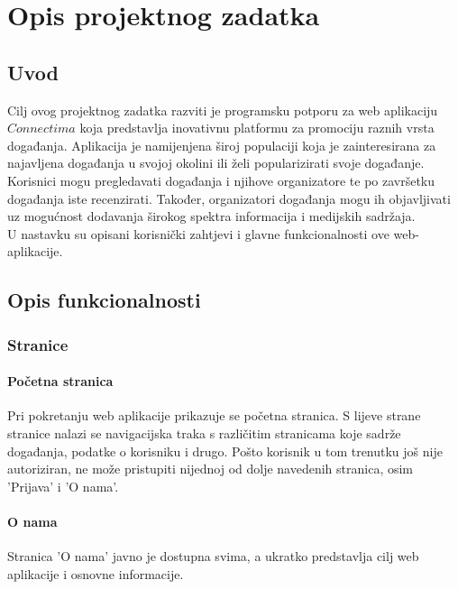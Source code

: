 \chapter{Opis projektnog zadatka}
				
		\section{Uvod}
		
			Cilj ovog projektnog zadatka razviti je programsku potporu za web aplikaciju $\textit{Connectima}$ koja predstavlja inovativnu platformu za promociju raznih vrsta događanja. Aplikacija je namijenjena široj populaciji koja je zainteresirana za najavljena događanja u svojoj okolini ili želi popularizirati svoje događanje. \\ Korisnici mogu pregledavati događanja i njihove organizatore te po završetku događanja iste recenzirati. Također, organizatori događanja mogu ih objavljivati uz mogućnost dodavanja širokog spektra informacija i medijskih sadržaja.\\
			U nastavku su opisani korisnički zahtjevi i glavne funkcionalnosti ove web-aplikacije.
		
		
		
		\section{Opis funkcionalnosti}
		
			\subsection{Stranice}
			
				\subsubsection{Početna stranica}
				Pri pokretanju web aplikacije prikazuje se početna stranica. S lijeve strane stranice nalazi se navigacijska traka s različitim stranicama koje sadrže događanja, podatke o korisniku i drugo. Pošto korisnik u tom trenutku još nije autoriziran, ne može pristupiti nijednoj od dolje navedenih stranica, osim 'Prijava' i 'O nama'.
				
				\subsubsection{O nama}
				Stranica 'O nama' javno je dostupna svima, a ukratko predstavlja cilj web aplikacije i osnovne informacije.
				
